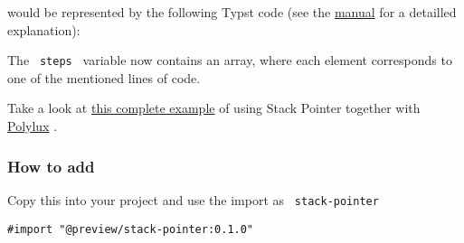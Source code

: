 \begin{Shaded}
\begin{Highlighting}[]
\OperatorTok{()} \OperatorTok{\{}
  \OperatorTok{=}\OperatorTok{();}
   \OperatorTok{;}
\OperatorTok{\}}

\OperatorTok{()} \OperatorTok{\{}
   \OperatorTok{;}
\OperatorTok{\}}
\end{Highlighting}
\end{Shaded}

would be represented by the following Typst code (see the
\href{https://github.com/typst/packages/raw/main/packages/preview/stack-pointer/0.1.0/docs/manual.pdf}{manual}
for a detailled explanation):

\begin{Shaded}
\begin{Highlighting}[]
\NormalTok{  \})}
\NormalTok{  \})}
\NormalTok{\})}
\end{Highlighting}
\end{Shaded}

The \texttt{\ steps\ } variable now contains an array, where each
element corresponds to one of the mentioned lines of code.

Take a look at
\href{https://github.com/typst/packages/raw/main/packages/preview/stack-pointer/0.1.0/gallery/sum.pdf}{this
complete example} of using Stack Pointer together with
\href{https://polylux.dev/book/}{Polylux} .

\subsubsection{How to add}\label{how-to-add}

Copy this into your project and use the import as
\texttt{\ stack-pointer\ }

\begin{verbatim}
#import "@preview/stack-pointer:0.1.0"
\end{verbatim}

